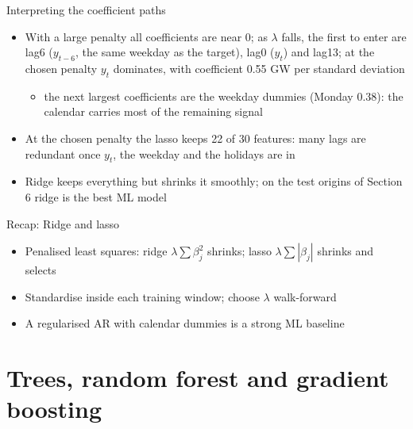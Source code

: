\begin{frame}{Interpreting the coefficient paths}
\itemsize{\small}
\begin{itemize}
    \item With a large penalty all coefficients are near 0; as $\lambda$ falls, the first to enter are lag6 ($y_{t-6}$, the same weekday as the target), lag0 ($y_t$) and lag13; at the chosen penalty $y_t$ dominates, with coefficient 0.55 GW per standard deviation
    \begin{itemize}
        \item the next largest coefficients are the weekday dummies (Monday 0.38): the calendar carries most of the remaining signal
    \end{itemize}
    \item At the chosen penalty the lasso keeps 22 of 30 features: many lags are redundant once $y_t$, the weekday and the holidays are in
    \item Ridge keeps everything but shrinks it smoothly; on the test origins of Section 6 ridge is the best ML model
\end{itemize}
\end{frame}

\begin{frame}{Recap: Ridge and lasso}
\itemsize{\small}
\begin{itemize}
    \item Penalised least squares: ridge $\lambda\sum\beta_j^2$ shrinks; lasso $\lambda\sum|\beta_j|$ shrinks and selects
    \item Standardise inside each training window; choose $\lambda$ walk-forward
    \item A regularised AR with calendar dummies is a strong ML baseline
\end{itemize}
\end{frame}


\section{Trees, random forest and gradient boosting}

